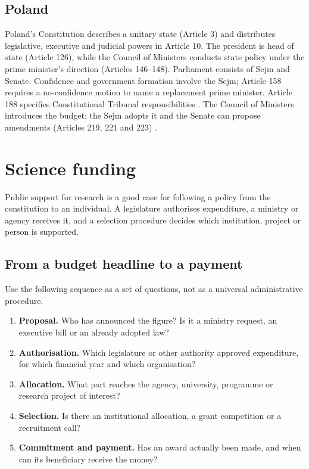 \subsection{Poland}
\label{section-gsf-poland}

Poland's Constitution describes a unitary
state
(Article 3) and distributes legislative,
executive
and judicial powers in Article 10.
The president is head of state (Article 126),
while the Council of Ministers conducts state
policy
under the prime minister's direction
(Articles 146--148).
Parliament consists of Sejm and Senate.
Confidence and government formation involve
the Sejm;
Article 158 requires a no-confidence motion
to name
a replacement prime minister.
Article 188 specifies Constitutional Tribunal
responsibilities \cite{gsf-pl-constitution}.
The Council of Ministers introduces the
budget;
the Sejm adopts it and the Senate can propose
amendments (Articles 219, 221 and 223)
\cite{gsf-pl-budget}.

\section{Science funding}
\label{section-gsf-funding}

Public support for research is a good case
for following a policy from the constitution
to an individual. A legislature authorises
expenditure, a ministry or agency receives
it, and a selection procedure decides which
institution, project or person is supported.

\subsection{From a budget headline to a payment}
\label{section-gsf-budget}

Use the following sequence as a set of
questions,
not as a universal administrative procedure.

\begin{enumerate}
\item \textbf{Proposal.} Who has announced
the figure?
Is it a ministry request, an executive bill
or an
already adopted law?
\item \textbf{Authorisation.} Which
legislature or
other authority approved expenditure, for
which
financial year and which organisation?
\item \textbf{Allocation.} What part reaches
the agency,
university, programme or research project of
interest?
\item \textbf{Selection.} Is there an
institutional
allocation, a grant competition or a
recruitment call?
\item \textbf{Commitment and payment.} Has an
award
actually been made, and when can its
beneficiary
receive the money?
\end{enumerate}

